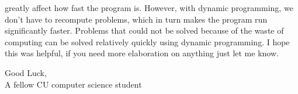 \documentclass[12pt]{article}
\begin{document}
greatly affect how fast the program is. However, with dynamic programming, we don't have to recompute problems, which in turn makes the program run significantly faster. Problems that could not be solved because of the waste of computing can be solved relatively quickly using dynamic programming. I hope this was helpful, if you need more elaboration on anything just let me know. 

Good Luck,
\\ A fellow CU computer science student 

\newpage
\pagebreak
\end{document}
